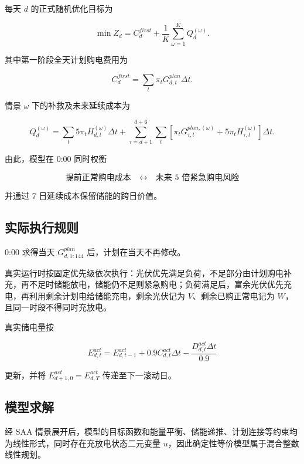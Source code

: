 每天 \(d\) 的正式随机优化目标为

\begin{equation}
\min Z_d
=
C_d^{first}
+
\frac1K
\sum_{\omega=1}^{K}
Q_d^{(\omega)}.
\end{equation}

其中第一阶段全天计划购电费用为

\begin{equation}
C_d^{first}
=
\sum_t
\pi_tG^{plan}_{d,t}\Delta t.
\end{equation}

情景 \(\omega\) 下的补救及未来延续成本为

\begin{equation}
Q_d^{(\omega)}
=
\sum_t
5\pi_tH_{d,t}^{(\omega)}\Delta t
+
\sum_{\tau=d+1}^{d+6}\sum_t
\left[
\pi_tG_{\tau,t}^{plan,(\omega)}
+
5\pi_tH_{\tau,t}^{(\omega)}
\right]\Delta t.
\end{equation}

由此，模型在 0:00 同时权衡

\[
\boxed{
\text{提前正常购电成本}
\quad\longleftrightarrow\quad
\text{未来 5 倍紧急购电风险}
}
\]

并通过 7 日延续成本保留储能的跨日价值。

\subsection{实际执行规则}

0:00 求得当天 \(G^{plan}_{d,1:144}\) 后，计划在当天不再修改。

真实运行时按固定优先级依次执行：光伏优先满足负荷，不足部分由计划购电补充，再不足时储能放电，储能仍不足则紧急购电；负荷满足后，富余光伏优先充电，再利用剩余计划电给储能充电，剩余光伏记为 \(V\)、剩余已购正常电记为 \(W\)，且同一时段不得同时充放电。

真实储电量按

\begin{equation}
E^{act}_{d,t}
=
E^{act}_{d,t-1}
+
0.9C^{act}_{d,t}\Delta t
-
\frac{D^{act}_{d,t}\Delta t}{0.9}
\end{equation}

更新，并将 \(E^{act}_{d+1,0}
=
E^{act}_{d,T}\) 传递至下一滚动日。

\subsection{模型求解}

经 SAA 情景展开后，模型的目标函数和能量平衡、储能递推、计划连接等约束均为线性形式，同时存在充放电状态二元变量 \(u\)，因此确定性等价模型属于混合整数线性规划。

